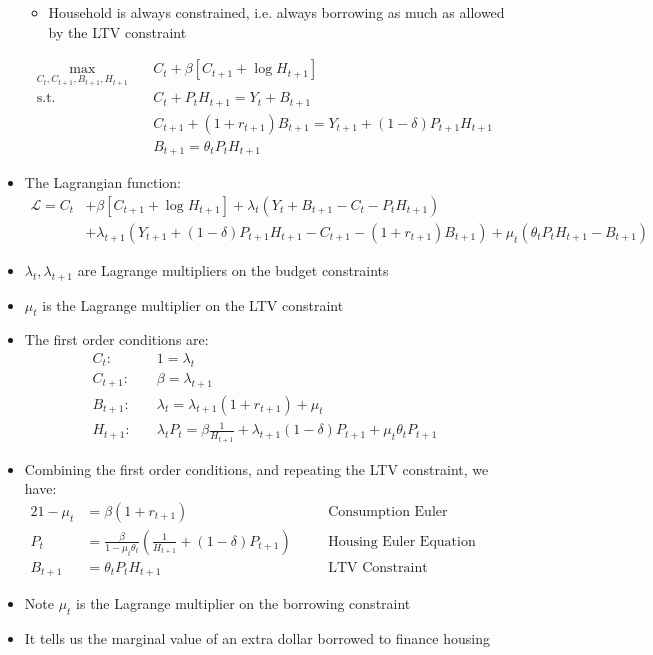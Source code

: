 \documentclass[a4paper,twoside]{article}
\newif\IfInSansMode
\numberwithin{equation}{section}
\numberwithin{figure}{section}
\begin{document}
\begin{itemize}
\begin{itemize}
			\item Household is always constrained, i.e. always borrowing as much as allowed by the LTV constraint
		\end{itemize}
		\begin{align*}
			\max_{C_t,C_{t+1},B_{t+1},H_{t+1}}\quad &C_t + \beta[C_{t+1} + \log H_{t+1}]\\
			\text{s.t.}\quad &C_t + P_t H_{t+1} = Y_t + B_{t+1}\\
			&C_{t+1} + (1+r_{t+1})B_{t+1} = Y_{t+1} + (1-\delta)P_{t+1}H_{t+1}\\
			&B_{t+1} = \theta_tP_tH_{t+1}
		\end{align*}
		\item The Lagrangian function:
		\begin{align*}
			\mathcal{L} = C_t &+ \beta[C_{t+1} + \log H_{t+1}] + \lambda_t(Y_t + B_{t+1} - C_t - P_t H_{t+1})\\ 
			&+ \lambda_{t+1}(Y_{t+1} + (1-\delta)P_{t+1}H_{t+1} - C_{t+1} - (1+r_{t+1})B_{t+1}) + \mu_t(\theta_tP_tH_{t+1} - B_{t+1})
		\end{align*}
		\item \( \lambda_t,\lambda_{t+1} \) are Lagrange multipliers on the budget constraints
		\item \( \mu_t \) is the Lagrange multiplier on the LTV constraint
		\item The first order conditions are:
		\begin{align*}
			C_t:& \quad1=\lambda_t\\
			C_{t+1}:& \quad\beta=\lambda_{t+1}\\
			B_{t+1}:& \quad\lambda_t=\lambda_{t+1}(1+r_{t+1})+\mu_t\\
			H_{t+1}:& \quad\lambda_tP_t=\beta\frac{1}{H_{t+1}}+\lambda_{t+1}(1-\delta)P_{t+1}+\mu_t\theta_tP_{t+1}
		\end{align*}
		\item Combining the first order conditions, and repeating the LTV constraint, we have:
		\begin{alignat*}{2}
			1-\mu_t&=\beta(1+r_{t+1}) &&\text{Consumption Euler Equation}\\
			P_t&=\frac{\beta}{1-\mu_t\theta_t}\left( \frac{1}{H_{t+1}} + (1-\delta)P_{t+1} \right)\quad &&\text{Housing Euler Equation}\\
			B_{t+1}&=\theta_tP_tH_{t+1} &&\text{LTV Constraint}
		\end{alignat*}
		\item Note \( \mu_t \) is the Lagrange multiplier on the borrowing constraint
		\item It tells us the marginal value of an extra dollar borrowed to finance housing
	\end{itemize}
\end{document}
